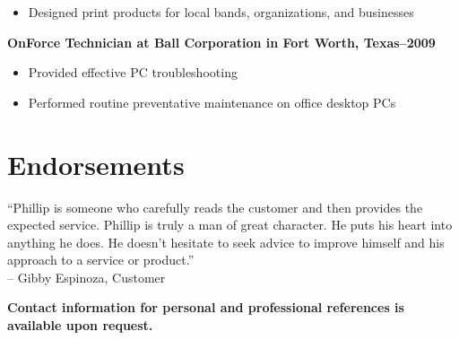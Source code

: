 \documentclass[margin]{res}
\newcommand{\sectionspace}{\vspace{10pt}}
\begin{document}
\begin{resume}
\begin{itemize}
                   \item Designed print products for local bands, organizations, and businesses
                 \end{itemize}
              
                \textbf{OnForce Technician
                 at Ball Corporation in Fort Worth, Texas--2009}
                 \vspace{-10pt}\begin{itemize} \itemsep -2pt %
                   \item Provided effective PC troubleshooting
                 
                   \item Performed routine preventative maintenance on office desktop PCs
                 \end{itemize}
              

\sectionspace


\section{Endorsements}

              
                ``Phillip is someone who carefully reads the customer and then provides the
expected service. Phillip is truly a man of great character. He puts his
heart into anything he does. He doesn't hesitate to seek advice to improve
himself and his approach to a service or product.''                    \\
                -- Gibby Espinoza, Customer
              

\sectionspace


\sectionspace


\textbf{\footnotesize Contact information for personal and professional references is available upon request.}


\end{resume}
\end{document}
